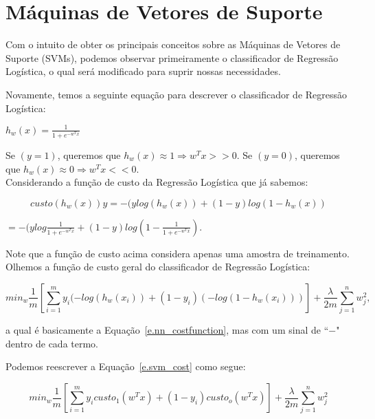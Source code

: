 \section{Máquinas de Vetores de Suporte}
\label{s.svm}

Com o intuito de obter os principais conceitos sobre as Máquinas de Vetores de Suporte (SVMs), podemos observar primeiramente o classificador de Regressão Logística, o qual será modificado para suprir nossas necessidades.

Novamente, temos a seguinte equação para descrever o classificador de Regressão Logística:

\begin{center}
$h_w(x)=\frac{1}{1+e^{-w^Tx}}$	
\end{center}

Se $(y = 1)$, queremos que $h_w(x) \approx 1 \Rightarrow w^Tx >> 0$.
Se $(y = 0)$, queremos que $h_w(x) \approx 0 \Rightarrow w^Tx << 0$.\\

Considerando a função de custo da Regressão Logística que já sabemos:

\begin{equation}
custo(h_w(x)) y = -(y log(h_w(x)) + (1-y)log(1-h_w(x))
\end{equation}
\begin{center}
$= -(y log \frac{1}{1+e^{-w^Tx}} + (1-y) log (1- \frac{1}{1+e^{-w^Tx}})$.
\end{center}

Note que a função de custo acima considera apenas uma amostra de treinamento. Olhemos a função de custo geral do classificador de Regressão Logística:

\begin{equation}
\label{e.svm_cost}
min_w \frac{1}{m} [\sum\limits_{i=1}^m y_i (-log(h_w(x_i)) + (1-y_i)(-log(1-h_w(x_i)))] + \frac{\lambda}{2m} \sum\limits_{j=1}^n w_j^2,
\end{equation}

a qual é basicamente a Equação~\ref{e.nn_costfunction}, mas com um sinal de ``$-$" dentro de cada termo.

Podemos reescrever a Equação~\ref{e.svm_cost} como segue:

\begin{equation}
\label{e.svm_newcost}
min_w \frac{1}{m}[\sum\limits_{i=1}^m y_i custo_1(w^Tx) + (1-y_i)custo_o(w^Tx)] + \frac{\lambda}{2m} \sum\limits_{j=1}^n w_j^2
\end{equation}

